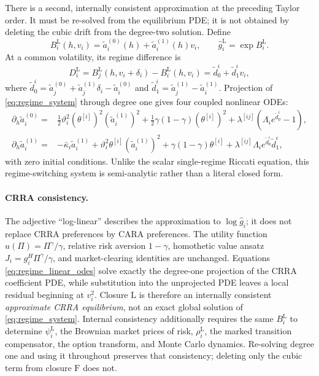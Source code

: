 \documentclass[11pt]{article}
\theoremstyle{remark}
\begin{document}
There is a second, internally consistent approximation at the preceding Taylor
order.  It must be re-solved from the equilibrium PDE; it is not obtained by
deleting the cubic drift from the degree-two solution.  Define
\begin{equation}\label{eq:regime_linear_ansatz}
B_i^{\mathrm L}(h,v_i)=\widetilde a_i^{(0)}(h)
+\widetilde a_i^{(1)}(h)v_i,
\qquad
\widehat g_i^{\mathrm L}=\exp B_i^{\mathrm L}.
\end{equation}
At a common volatility, its regime difference is
\begin{equation}\label{eq:regime_linear_difference}
D_i^{\mathrm L}=B_j^{\mathrm L}(h,v_i+\delta_i)-B_i^{\mathrm L}(h,v_i)
=\widetilde d_0^i+\widetilde d_1^iv_i,
\end{equation}
where
$\widetilde d_0^i=\widetilde a_j^{(0)}+\widetilde a_j^{(1)}\delta_i
-\widetilde a_i^{(0)}$ and
$\widetilde d_1^i=\widetilde a_j^{(1)}-\widetilde a_i^{(1)}$.
Projection of \eqref{eq:regime_system} through degree one gives four coupled
nonlinear ODEs:
\begin{equation}\label{eq:regime_linear_odes}
\begin{split}
\partial_h\widetilde a_i^{(0)}={}&
\frac12\vartheta_i^2(\theta^{[i]})^2(\widetilde a_i^{(1)})^2
+\frac12\gamma(1-\gamma)(\theta^{[i]})^2
+\lambda^{[ij]}\left(\Lambda_i e^{\widetilde d_0^i}-1\right),\\
\partial_h\widetilde a_i^{(1)}={}&
-\bar\kappa_i\widetilde a_i^{(1)}
+\vartheta_i^2\theta^{[i]}(\widetilde a_i^{(1)})^2
+\gamma(1-\gamma)\theta^{[i]}
+\lambda^{[ij]}\Lambda_i e^{\widetilde d_0^i}\widetilde d_1^i,
\end{split}
\end{equation}
with zero initial conditions.  Unlike the scalar single-regime Riccati equation,
this regime-switching system is semi-analytic rather than a literal closed form.

\paragraph{CRRA consistency.}
The adjective ``log-linear'' describes the approximation to $\log \widehat g_i$;
it does not replace CRRA preferences by CARA preferences.  The utility function
$u(\Pi)=\Pi^\gamma/\gamma$, relative risk aversion $1-\gamma$, homothetic value
ansatz $J_i=g_i^H\Pi^\gamma/\gamma$, and market-clearing identities are unchanged.
Equations \eqref{eq:regime_linear_odes} solve exactly the degree-one projection of
the CRRA coefficient PDE, while substitution into the unprojected PDE leaves a
local residual beginning at $v_i^2$.  Closure $\mathrm L$ is therefore an
internally consistent \emph{approximate CRRA equilibrium}, not an exact global
solution of \eqref{eq:regime_system}.  Internal consistency additionally requires
the same $B_i^{\mathrm L}$ to determine $\psi_i^{\mathrm L}$, the Brownian market
prices of risk, $\rho_i^{\mathrm L}$, the marked transition compensator, the option
transform, and Monte Carlo dynamics.  Re-solving degree one and using it throughout
preserves that consistency; deleting only the cubic term from closure $\mathrm F$
does not.
\end{document}
